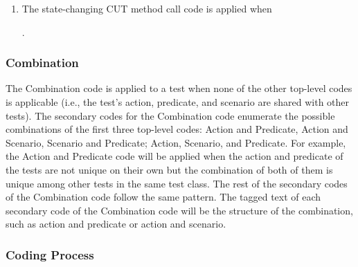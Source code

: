 \begin{enumerate}
.
    \item The state-changing CUT method call code is applied when
    .
\end{enumerate}

\subsubsection{Combination}

The Combination code is applied to a test when none of the other top-level codes is applicable (i.e., the test’s action, predicate, and scenario are shared with other tests).
%
The secondary codes for the Combination code enumerate the possible combinations of the first three top-level codes: Action and Predicate, Action and Scenario, Scenario and Predicate; Action, Scenario, and Predicate.
%
For example, the Action and Predicate code will be applied when the action and predicate of the tests are not unique on their own but the combination of both of them is unique among other tests in the same test class.
%
The rest of the secondary codes of the Combination code follow the same pattern. The tagged text of each secondary code of the Combination code will be the structure of the combination, such as action and predicate or action and scenario.

\subsubsection{Coding Process}

